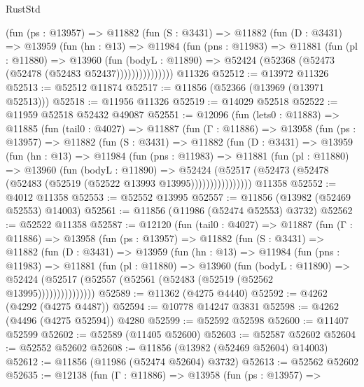 \begin{lexlean}{RustStd}
\begin{coremodule}
            (fun (ps : @13957) =>
            @11882
              (fun (S : @3431) =>
              @11882
                (fun (D : @3431) =>
                @13959
                  (fun (hn : @13) =>
                  @11984
                    (fun (pns : @11983) =>
                    @11881
                      (fun (pl : @11880) =>
                      @13960
                        (fun (bodyL : @11890) =>
                        @52424 (@52368 (@52473 (@52478 (@52483 @52437)))))))))))))))
    @11326
@52512 := @13972 @11326
@52513 := @52512 @11874
@52517 := @11856 (@52366 (@13969 (@13971 @52513)))
@52518 := @11956 @11326
@52519 := @14029 @52518
@52522 := @11959 @52518 @52432 @49087
@52551 := @12096
    (fun (lets0 : @11883) =>
    @11885
      (fun (tail0 : @4027) =>
      @11887
        (fun (Γ : @11886) =>
        @13958
          (fun (ps : @13957) =>
          @11882
            (fun (S : @3431) =>
            @11882
              (fun (D : @3431) =>
              @13959
                (fun (hn : @13) =>
                @11984
                  (fun (pns : @11983) =>
                  @11881
                    (fun (pl : @11880) =>
                    @13960
                      (fun (bodyL : @11890) =>
                      @52424
                        (@52517
                          (@52473 (@52478 (@52483 (@52519 (@52522 @13993 @13995))))))))))))))))
    @11358
@52552 := @4012 @11358
@52553 := @52552 @13995
@52557 := @11856 (@13982 (@52469 @52553) @14003)
@52561 := @11856 (@11986 (@52474 @52553) @3732)
@52562 := @52522 @11358
@52587 := @12120
    (fun (tail0 : @4027) =>
    @11887
      (fun (Γ : @11886) =>
      @13958
        (fun (ps : @13957) =>
        @11882
          (fun (S : @3431) =>
          @11882
            (fun (D : @3431) =>
            @13959
              (fun (hn : @13) =>
              @11984
                (fun (pns : @11983) =>
                @11881
                  (fun (pl : @11880) =>
                  @13960
                    (fun (bodyL : @11890) =>
                    @52424 (@52517 (@52557 (@52561 (@52483 (@52519 (@52562 @13995)))))))))))))))
@52589 := @11362 (@4275 @4440)
@52592 := @4262 (@4292 (@4275 @4487))
@52594 := @10778 @14247 @3831
@52598 := @4262 (@4496 (@4275 @52594)) @4280
@52599 := @52592 @52598
@52600 := @11407 @52599
@52602 := @52589 (@11405 @52600)
@52603 := @52587 @52602
@52604 := @52552 @52602
@52608 := @11856 (@13982 (@52469 @52604) @14003)
@52612 := @11856 (@11986 (@52474 @52604) @3732)
@52613 := @52562 @52602
@52635 := @12138
    (fun (Γ : @11886) =>
    @13958
      (fun (ps : @13957) =>

\end{coremodule}
\end{lexlean}

